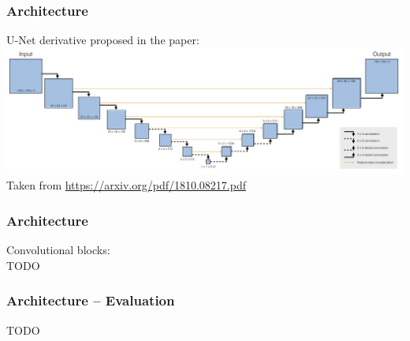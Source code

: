 \begin{frame}
    \frametitle{Architecture}

U-Net derivative proposed in the paper: \\[\baselineskip]

\includegraphics[width=\textwidth, height=.55\textheight]{./Ressourcen/Praesentation/Bilder/architecture.png}%
\newline
Taken from \url{https://arxiv.org/pdf/1810.08217.pdf}
\end{frame}
\clearpage

\begin{frame}
    \frametitle{Architecture}

Convolutional blocks: \\[\baselineskip]
TODO

\end{frame}
\clearpage

\begin{frame}
    \frametitle{Architecture -- Evaluation}

TODO

\end{frame}
\clearpage